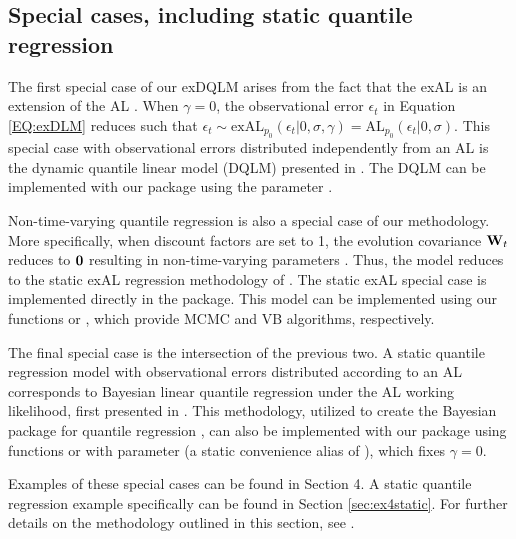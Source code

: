 \documentclass[jss]{jss}
\begin{document}
\subsection{Special cases, including static quantile regression}
\label{sec:special}

The first special case of our exDQLM arises from the fact that the exAL is an extension of the AL \citep{yan2025family}. When $\gamma = 0$, the
observational error $\epsilon_t$ in Equation \eqref{EQ:exDLM} reduces such that $\epsilon_t \sim \text{exAL}_{p_0}(\epsilon_t |0,\sigma,\gamma) = \text{AL}_{p_0}(\epsilon_t |0,\sigma)$. This special case with observational errors distributed independently from an AL is the dynamic quantile linear model (DQLM) presented in \cite{gonccalves2017dynamic}. The DQLM can be implemented with our package using the parameter .

Non-time-varying quantile regression is also a special case of our methodology. More specifically, when discount factors are set to 1, the evolution covariance ${\bf W}_t$ reduces to ${\bf 0}$ resulting in non-time-varying parameters \citep{west1985dynamic}. Thus, the model reduces to the static exAL regression methodology of \cite{yan2025family}. The static exAL special case is implemented directly in the package. This model can be implemented using our functions  or , which provide MCMC and VB algorithms, respectively.

The final special case is the intersection of the previous two. A static quantile regression model with observational errors distributed according to an AL corresponds to Bayesian linear quantile regression under the AL working likelihood, first presented in \cite{yu2001bayesian}. This methodology, utilized to create the Bayesian package for quantile regression , can also be implemented with our package using functions  or  with parameter  (a static convenience alias of ), which fixes $\gamma = 0$.

Examples of these special cases can be found in Section 4. A static quantile regression example specifically can be found in Section \ref{sec:ex4static}. For further details on the methodology outlined in this section, see \cite{me}.

\end{document}
